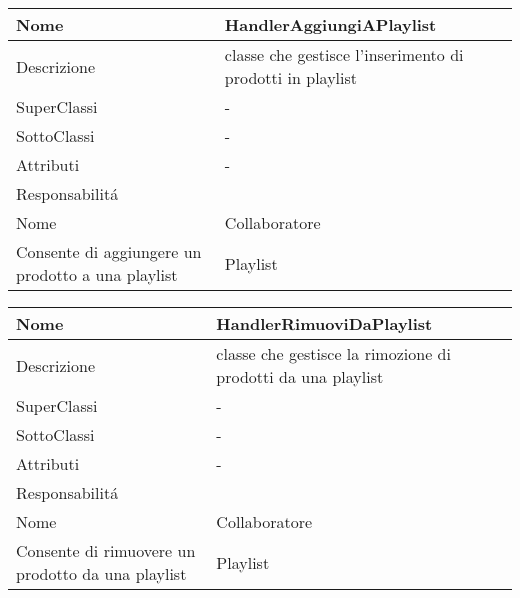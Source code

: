 \begin{center} 
    \begin{longtable}{ |p{3cm}|p{3cm}|p{3cm}|p{3cm}| }
        \hline
        Nome & \multicolumn{3}{|p{9cm}|}{HandlerAggiungiAPlaylist} \\\hline
        Descrizione & \multicolumn{3}{|p{9cm}|}{classe che gestisce l'inserimento di prodotti in playlist} \\\hline
        SuperClassi & \multicolumn{3}{|p{9cm}|}{-} \\\hline
        SottoClassi & \multicolumn{3}{|p{9cm}|}{-} \\\hline
        Attributi & \multicolumn{3}{|p{9cm}|}{-} \\\hline
        \multicolumn{4}{|p{12cm}|}{Responsabilit\'a} \\\hline %
        \multicolumn{2}{|p{6cm}|}{Nome} & \multicolumn{2}{|p{6cm}|}{Collaboratore} \\\hline
        \multicolumn{2}{|p{6cm}|}{Consente di aggiungere un prodotto a una playlist} & \multicolumn{2}{|p{6cm}|}{Playlist} \\\hline
    \end{longtable}
\end{center}

\begin{center} 
    \begin{longtable}{ |p{3cm}|p{3cm}|p{3cm}|p{3cm}| }
        \hline
        Nome & \multicolumn{3}{|p{9cm}|}{HandlerRimuoviDaPlaylist} \\\hline
        Descrizione & \multicolumn{3}{|p{9cm}|}{classe che gestisce la rimozione di prodotti da una playlist} \\\hline
        SuperClassi & \multicolumn{3}{|p{9cm}|}{-} \\\hline
        SottoClassi & \multicolumn{3}{|p{9cm}|}{-} \\\hline
        Attributi & \multicolumn{3}{|p{9cm}|}{-} \\\hline
        \multicolumn{4}{|p{12cm}|}{Responsabilit\'a} \\\hline %
        \multicolumn{2}{|p{6cm}|}{Nome} & \multicolumn{2}{|p{6cm}|}{Collaboratore} \\\hline
        \multicolumn{2}{|p{6cm}|}{Consente di rimuovere un prodotto da una playlist} & \multicolumn{2}{|p{6cm}|}{Playlist} \\\hline
    \end{longtable}
\end{center}

